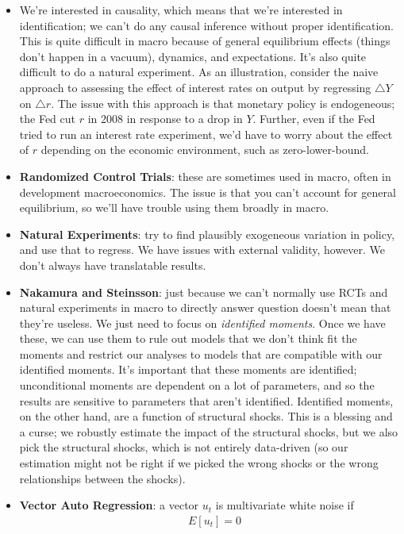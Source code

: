 \documentclass[12pt]{article}
\begin{document}
\begin{itemize}
    \item We're interested in causality, which means that we're interested in identification; we can't do any causal inference without proper identification. This is quite difficult in macro because of general equilibrium effects (things don't happen in a vacuum), dynamics, and expectations. It's also quite difficult to do a natural experiment. As an illustration, consider the naive approach to assessing the effect of interest rates on output by regressing $\triangle Y$ on $\triangle r$. The issue with this approach is that monetary policy is endogeneous; the Fed cut $r$ in 2008 in response to a drop in $Y$. Further, even if the Fed tried to run an interest rate experiment, we'd have to worry about the effect of $r$ depending on the economic environment, such as zero-lower-bound.
    \item \textbf{Randomized Control Trials}: these are sometimes used in macro, often in development macroeconomics. The issue is that you can't account for general equilibrium, so we'll have trouble using them broadly in macro.
    \item \textbf{Natural Experiments}: try to find plausibly exogeneous variation in policy, and use that to regress. We have issues with external validity, however. We don't always have translatable results. 
    \item \textbf{Nakamura and Steinsson}: just because we can't normally use RCTs and natural experiments in macro to directly answer question doesn't mean that they're useless. We just need to focus on \textit{identified moments}. Once we have these, we can use them to rule out models that we don't think fit the moments and restrict our analyses to models that are compatible with our identified moments. It's important that these moments are identified; unconditional moments are dependent on a lot of parameters, and so the results are sensitive to parameters that aren't identified. Identified moments, on the other hand, are a function of structural shocks. This is a blessing and a curse; we robustly estimate the impact of the structural shocks, but we also pick the structural shocks, which is not entirely data-driven (so our estimation might not be right if we picked the wrong shocks or the wrong relationships between the shocks).
    \item \textbf{Vector Auto Regression}: a vector $u_t$ is multivariate white noise if
    \[\begin{split}
        &E[u_t] = 0 \\

\end{split}\]
\end{itemize}
\end{document}
